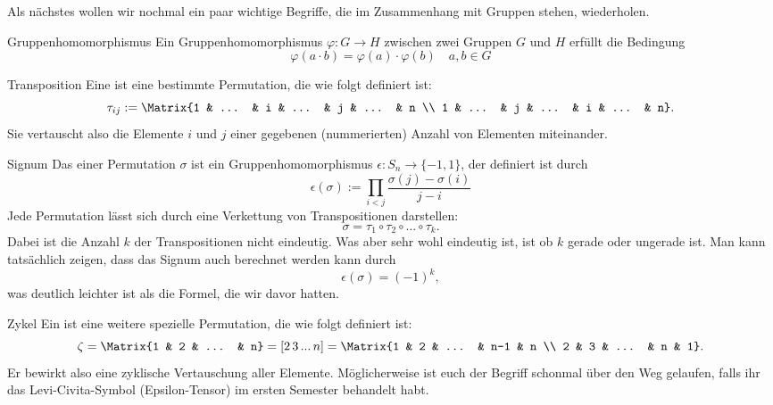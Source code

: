 Als nächstes wollen wir nochmal ein paar wichtige Begriffe, die im Zusammenhang mit Gruppen stehen, wiederholen.
\begin{Wiederholung}
{Gruppenhomomorphismus}
Ein Gruppenhomomorphismus $\varphi: G \rightarrow H$ zwischen zwei Gruppen $G$ und $H$ erfüllt die Bedingung
\begin{equation*}
    \varphi (a\cdot b)=\varphi (a) \cdot \varphi (b) \quad a,b \in G 
\end{equation*}
\end{Wiederholung}
\begin{Wiederholung}
{Transposition}
Eine  ist eine bestimmte Permutation, die wie folgt definiert ist:
\begin{equation*}
    \tau_{ij} := \Matrix{1 & ... & i & ... & j & ... & n \\ 1 & ... & j & ... & i & ... & n}.
\end{equation*}
Sie vertauscht also die Elemente $i$ und $j$ einer gegebenen (nummerierten) Anzahl von Elementen miteinander.
\end{Wiederholung}
\begin{Wiederholung}
{Signum}
Das  einer Permutation $\sigma$ ist ein Gruppenhomomorphismus $\epsilon : S_{n} \rightarrow \{-1,1\}$, der definiert ist durch
\begin{equation*}
    \epsilon (\sigma) := \prod_{i<j} \frac{\sigma(j)-\sigma(i)}{j-i}
\end{equation*}
Jede Permutation lässt sich durch eine Verkettung von Transpositionen darstellen:
\begin{equation*}
    \sigma = \tau_{1}\circ\tau_{2} \circ ... \circ \tau_{k}.
\end{equation*}
Dabei ist die Anzahl $k$ der Transpositionen nicht eindeutig. Was aber sehr wohl eindeutig ist, ist ob $k$ gerade oder ungerade ist. Man kann tatsächlich zeigen, dass das Signum auch berechnet werden kann durch
\begin{equation*}
    \epsilon(\sigma)=(-1)^{k},
\end{equation*}
was deutlich leichter ist als die Formel, die wir davor hatten.
\end{Wiederholung}
\begin{Wiederholung}
{Zykel}
Ein  ist eine weitere spezielle Permutation, die wie folgt definiert ist:
\begin{equation*}
    \zeta = \Matrix{1 & 2 & ... & n} = [2\,3\, ... \, n] = \Matrix{1 & 2 & ... & n-1 & n \\ 2 & 3 & ... & n & 1}.
\end{equation*}
Er bewirkt also eine zyklische Vertauschung aller Elemente. Möglicherweise ist euch der Begriff schonmal über den Weg gelaufen, falls ihr das Levi-Civita-Symbol (Epsilon-Tensor) im ersten Semester behandelt habt.
\end{Wiederholung}
